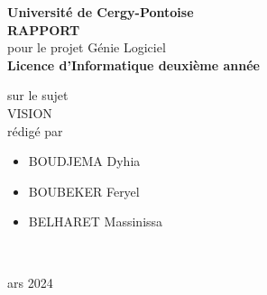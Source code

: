 
\begin{titlepage}{
    \begin{center}
        \vspace* {25mm}
        {\Large \textbf {Université de Cergy-Pontoise}} \\
        \vspace* {10mm}
        {\Large \textbf {RAPPORT}} \\
        \vspace* {10mm}
        pour le projet Génie Logiciel \\
        \textbf {Licence d'Informatique deuxième année} \\
        \vspace* {10mm}

	sur le sujet \\
        \vspace* {10mm}
	{\Huge \textsf{VISION}} \\
        \vspace* {10mm}
 	rédigé par \\
        \vspace* {10mm}
        \begin{itemize}
           \centering
                \item BOUDJEMA Dyhia
                \item BOUBEKER Feryel
                \item BELHARET Massinissa
        \end{itemize}
				\vspace* {10mm}
				 \\
        \date Mars 2024
        \vspace* {10mm}
	\end{center}
}
\end{titlepage}
